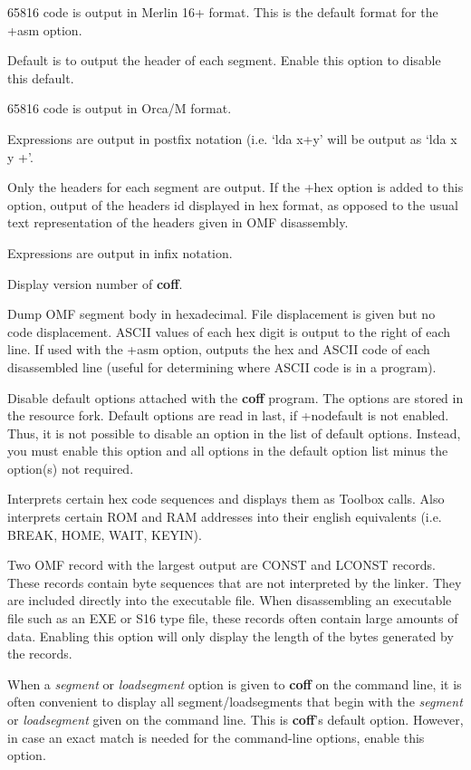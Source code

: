 65816 code is output in Merlin 16+ format. This is
the default format for the +asm option.

Default is to output the header of each segment.
Enable this option to disable this default.

65816 code is output in Orca/M format.

Expressions are output in postfix notation (i.e.
`{\text lda x+y}' will be output as `{\text lda x y +}'.

Only the headers for each segment are output. If the
+hex option is added to this option, output of the headers id displayed
in hex format, as opposed to the usual text representation of the headers
given in OMF disassembly.

Expressions are output in infix notation.

Display version number of {\bf coff}.

Dump OMF segment body in hexadecimal. File displacement is
given but no code displacement. ASCII values of each hex digit is output to
the right of each line. If used with the +asm option, outputs the hex and
ASCII code of each disassembled line (useful for determining where ASCII
code is in a program).

Disable default options attached with the {\bf coff}
program. The options are stored in the resource fork. Default options are
read in last, if +nodefault is not enabled. Thus, it is not possible
to disable an option in the list of default options. Instead, you must
enable this option and all options in the default option list minus the
option(s) not required.

Interprets certain hex code sequences and displays them as
Toolbox calls. Also interprets certain ROM and RAM addresses into their
english equivalents (i.e. BREAK, HOME, WAIT, KEYIN).

Two OMF record with the largest output are
{\omf CONST} and {\omf LCONST} records. These records contain byte
sequences that are not interpreted by the linker. They are included
directly into the executable file. When disassembling an executable
file such as an EXE or S16 type file, these records often contain large
amounts of data. Enabling this option will only display the length of
the bytes generated by the records.

When a {\it segment} or {\it loadsegment} option is given
to {\bf coff} on the command line, it is often convenient to display all
segment/loadsegments that begin with the {\it segment} or {\it loadsegment}
given on the command line. This is {\bf coff}'s default option. However, in
case an exact match is needed for the command-line options, enable this
option.

